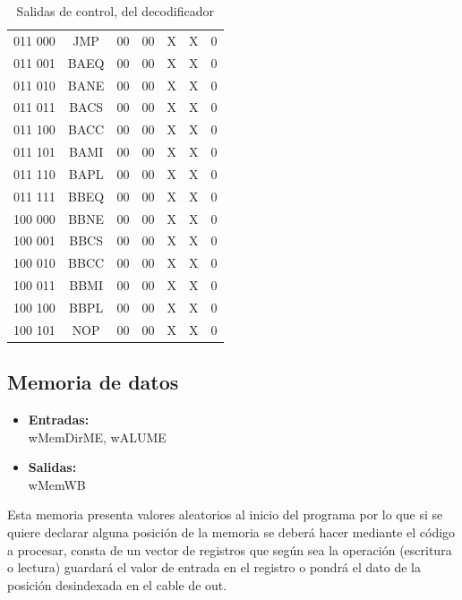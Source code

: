 \documentclass[paper=letter, fontsize=12pt]{article}
\begin{document}
\begin{table}
\begin{tabular}{cc|ccccc}
011 000 	& JMP			& 00 	& 00    & X     & X     & 0 \\
011 001 	& BAEQ			& 00 	& 00    & X     & X     & 0 \\
011 010 	& BANE			& 00 	& 00    & X     & X     & 0 \\
011 011 	& BACS			& 00 	& 00    & X     & X     & 0 \\
011 100 	& BACC			& 00 	& 00    & X     & X     & 0 \\
011 101 	& BAMI			& 00 	& 00    & X     & X     & 0 \\
011 110 	& BAPL			& 00 	& 00    & X     & X     & 0 \\
011 111 	& BBEQ			& 00 	& 00    & X     & X     & 0 \\
100 000 	& BBNE			& 00 	& 00    & X     & X     & 0 \\
100 001 	& BBCS			& 00 	& 00    & X     & X     & 0 \\
100 010 	& BBCC			& 00 	& 00    & X     & X     & 0 \\
100 011 	& BBMI			& 00 	& 00    & X     & X     & 0 \\
100 100 	& BBPL			& 00 	& 00    & X     & X     & 0 \\

100 101 	& NOP			& 00 	& 00    & X     & X     & 0 \\

\end{tabular}
\caption{Salidas de control, del decodificador}
\label{tablaDecodificacion}
\end{table}

\subsection{Memoria de datos}

\begin{itemize}
\item \textbf{Entradas:}\\
wMemDirME, wALUME
\item \textbf{Salidas:}\\
wMemWB
\end{itemize}

Esta memoria presenta valores aleatorios al inicio del programa por lo que si se quiere declarar alguna posición de la memoria se deberá hacer mediante el código a procesar, consta de un vector de registros que según sea la operación (escritura o lectura) guardará el valor de entrada en el registro o pondrá el dato de la posición desindexada en el cable de out.
\end{document}
